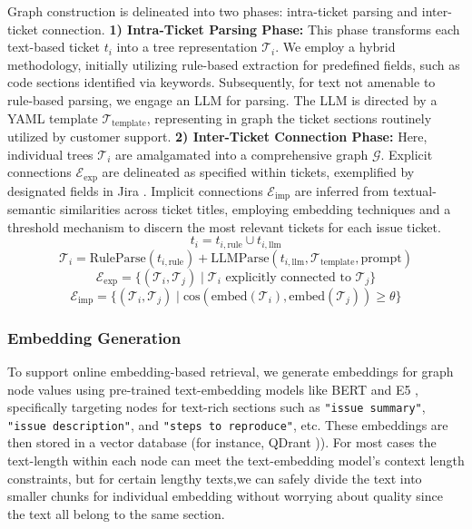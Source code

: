\documentclass[sigconf]{acmart}
\begin{document}
Graph construction is delineated into two phases: intra-ticket parsing and inter-ticket connection. \textbf{1) Intra-Ticket Parsing Phase:} This phase transforms each text-based ticket \(t_i\) into a tree representation \( \mathcal{T}_i \). We employ a hybrid methodology, initially utilizing rule-based extraction for predefined fields, such as code sections identified via keywords. Subsequently, for text not amenable to rule-based parsing, we engage an LLM for parsing. The LLM is directed by a YAML template \( \mathcal{T}_{\text{template}} \), representing in graph the ticket sections routinely utilized by customer support. \textbf{2) Inter-Ticket Connection Phase:} Here, individual trees \( \mathcal{T}_i \) are amalgamated into a comprehensive graph \( \mathcal{G} \). Explicit connections \( \mathcal{E}_{\text{exp}} \) are delineated as specified within tickets, exemplified by designated fields in Jira \cite{AtlassianJira}. Implicit connections \( \mathcal{E}_{\text{imp}} \) are inferred from textual-semantic similarities across ticket titles, employing embedding techniques and a threshold mechanism to discern the most relevant tickets for each issue ticket.
$$ t_i = t_{i, \text{rule}} \cup t_{i, \text{llm}} $$
$$ \mathcal{T}_i = \text{RuleParse}(t_{i, \text{rule}}) + \text{LLMParse}(t_{i, \text{llm}}, \mathcal{T}_{\text{template}}, \text{prompt}) $$
$$ \mathcal{E}_{\text{exp}} = \{(\mathcal{T}_i, \mathcal{T}_j) \mid \mathcal{T}_i \text{ explicitly connected to } \mathcal{T}_j\} $$
$$ \mathcal{E}_{\text{imp}} = \{(\mathcal{T}_i, \mathcal{T}_j) \mid \text{cos}(\text{embed}(\mathcal{T}_i), \text{embed}(\mathcal{T}_j)) \geq \theta \}$$

\subsubsection{Embedding Generation}
\label{subsubsection: embedding_generation}
To support online embedding-based retrieval, we generate embeddings for graph node values using pre-trained text-embedding models like BERT \cite{devlin2018bert} and E5 \cite{wang2022text}, specifically targeting nodes for text-rich sections such as \texttt{"issue summary"}, \texttt{"issue description"}, and \texttt{"steps to reproduce"}, etc. These embeddings are then stored in a vector database (for instance, QDrant \cite{qdrant2024})). For most cases the text-length within each node can meet the text-embedding model's context length constraints, but for certain lengthy texts,we can safely divide the text into smaller chunks for individual embedding without worrying about quality since the text all belong to the same section.
\end{document}
